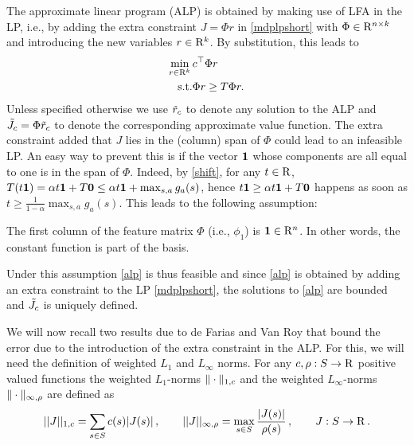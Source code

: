 The approximate linear program (ALP) is obtained by making use of LFA in the LP, i.e., by adding the extra constraint $J=\Phi r$ in \eqref{mdplpshort} with $\Phi \in \mathrm{R}^{n\times k}$ and introducing 
the new variables $r\in \mathrm{R}^k$. 
By substitution, this leads to
\begin{align}\label{alp}
\begin{split}
\min_{r\in \R^k}\, &c^\top \Phi r\\
\text{s.t.}\mb &\Phi r\geq T \Phi r.
\end{split}
\end{align}
Unless specified otherwise we use $\tilde{r}_c$ to denote any solution 
to the ALP and $\tilde{J}_c=\Phi \tilde{r}_c$ to denote the corresponding approximate value function. 
The extra constraint added that $J$ lies in the (column) span of $\Phi$ could lead to an infeasible LP. An easy way to prevent this is if the vector $\mathbf{1}$ whose components are all equal to one is in the span of $\Phi$.
Indeed, by \cref{shift}, for any $t\in \mathrm{R}$, $T (t\mathbf{1} ) =  \alpha t \mathbf{1}+T \mathbf{0} \le \alpha t \mathbf{1} + \max_{s,a} g_a(s)$, hence $t\mathbf{1} \ge \alpha t \mathbf{1}+T\mathbf{0} $ happens as soon as
$t\ge \frac{1}{1-\alpha}\max_{s,a} g_a(s)$. 
This leads to the following assumption:
\begin{assumption}\label{one}
The first column of the feature matrix $\Phi$ (i.e., $\phi_1$) is $\mathbf{1} \in \mathrm{R}^n$. 
In other words, the constant function is part of the basis.
\end{assumption}
Under this assumption \eqref{alp} is thus feasible and since \eqref{alp} is obtained by adding an extra constraint to the LP \eqref{mdplpshort}, the solutions to  \eqref{alp} are bounded and $\tilde{J}_c$ is uniquely defined.

We will now recall two results due to de Farias and Van Roy 
	that bound the error due to the introduction of the extra constraint in the ALP.
For this, we will need the definition of weighted $L_1$ and $L_\infty$ norms.
For any $c,\rho:S \to \mathrm{R}$ positive valued functions
the weighted $L_1$-norms $\|\cdot\|_{1,c}$ 
and 
the weighted $L_\infty$-norms  $\|\cdot\|_{\infty,\rho}$ are defined as
\begin{align*}
||J||_{1,c}=\sum_{s \in S} c(s)|J(s)|\,, \qquad
||J||_{\infty,\rho}=\max_{s \in S} \frac{|J(s)|}{\rho(s)}\,, \qquad J:S\to \mathrm{R}\,.
\end{align*}

